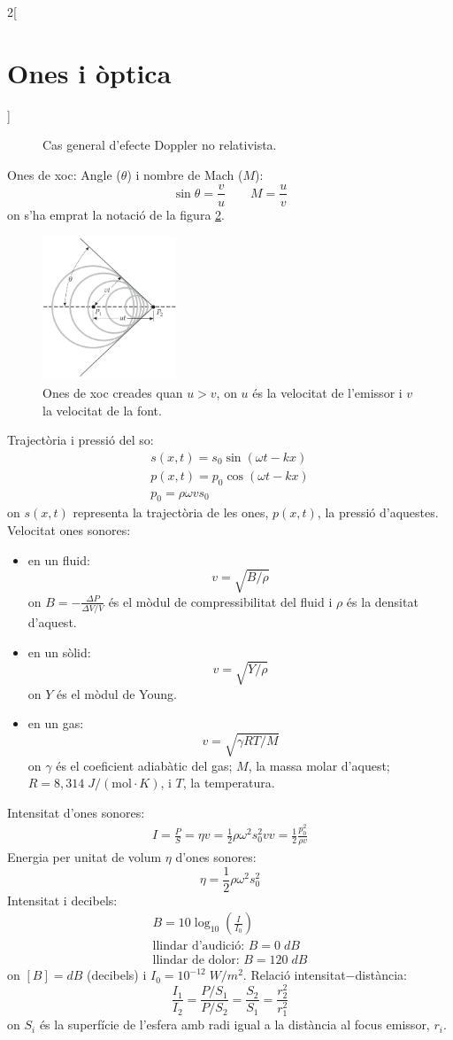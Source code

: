 \documentclass[class=article,10pt,crop=false]{standalone}
\begin{document}
\begin{multicols}{2}[\section{Ones i òptica}]
\begin{figure}
   \caption{Cas general d'efecte Doppler no relativista.}
   \label{dopp}
\end{figure}
Ones de xoc:
Angle ($\theta$) i nombre de Mach ($M$): $$\sin\theta=\frac{v}{u}\qquad M=\frac{u}{v}$$ {\footnotesize on s'ha emprat la notació de la figura \ref{xoc}.}\newline
\begin{figure}
   \centering
   \includegraphics[width=4cm]{Physics/1st/Ones_i_optica/Imatges/onesdexoc.jpg}
   \caption{Ones de xoc creades quan $u>v$, on $u$ és la velocitat de l'emissor i $v$ la velocitat de la font.}
   \label{xoc}
\end{figure}
Trajectòria i pressió del so:
\begin{gather*}
    s(x,t)=s_0\sin\left(\omega t-kx\right)\\
    p(x,t)=p_0\cos\left(\omega t-kx\right)\\
    p_0=\rho\omega vs_0
\end{gather*}
{\footnotesize on $s(x,t)$ representa la trajectòria de les ones, $p(x,t)$, la pressió d'aquestes.}\newline
Velocitat ones sonores:
\begin{itemize}
    \item en un fluid: $$v=\sqrt{B/\rho}$$ {\footnotesize on $B=-\frac{\Delta P}{\Delta V/V}$ és el mòdul de com\-pres\-si\-bi\-li\-tat del fluid i $\rho$ és la densitat d'aquest.}
    \item en un sòlid:
     $$v=\sqrt{Y/\rho}$$ {\footnotesize on $Y$ és el mòdul de Young.}
    \item en un gas:
    $$v=\sqrt{\gamma RT/M}$$ {\footnotesize on $\gamma$ és el coeficient adiabàtic del gas; $M$, la massa molar d'aquest; $R=8,314\;J/(\text{mol}\cdot K)$, i $T$, la temperatura.}
\end{itemize}
Intensitat d'ones sonores:
\begin{gather*}
    I=\frac{P}{S}=\eta v=\frac{1}{2}\rho\omega^2s_0^2v v=\frac{1}{2}\frac{p_0^2}{\rho v}
\end{gather*}
Energia per unitat de volum $\eta$ d'ones sonores:
$$\eta=\frac{1}{2}\rho\omega^2s_0^2$$
Intensitat i decibels:
\begin{gather*}
    B=10\log_{10}\left(\frac{I}{I_0}\right)\\
    \text{llindar d'audició: }B= 0\;dB\\
    \text{llindar de dolor: }B= 120\;dB
\end{gather*}
{\footnotesize on $[B]=dB$ (decibels) i $I_0=10^{-12}\;W/m^2$.}
Relació intensitat$-$distància: $$\frac{I_1}{I_2}=\frac{P/S_1}{P/S_2}=\frac{S_2}{S_1}=\frac{r_2^2}{r_1^2}$$ {\footnotesize on $S_i$ és la superfície de l'esfera amb radi igual a la distància al focus emissor, $r_i$.}

\end{multicols}
\end{document}
